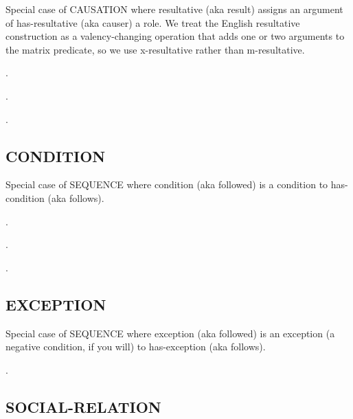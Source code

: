 \documentclass[a4paper]{article}
\newcommand{\fr}[1]{\textsf{#1}}
\newcommand{\rl}[1]{\textsf{#1}}
\begin{document}
Special case of \fr{CAUSATION} where \rl{resultative} (aka \rl{result}) assigns
an argument of \rl{has-resultative} (aka \rl{causer}) a role. We treat the
English resultative construction as a valency-changing operation that adds one
or two arguments to the matrix predicate, so we use \rl{x-resultative} rather
than \rl{m-resultative}.

\ex.

\ex.

\ex.


\subsection{\fr{CONDITION}}
\label{sec:CONDITION}

Special case of \fr{SEQUENCE} where \rl{condition} (aka \rl{followed}) is a
condition to \rl{has-condition} (aka \rl{follows}).

\ex.

\ex.

\ex.

\subsection{\fr{EXCEPTION}}
\label{sec:EXCEPTION}

Special case of \fr{SEQUENCE} where \rl{exception} (aka \rl{followed}) is an
exception (a negative condition, if you will) to \rl{has-exception} (aka \rl{follows}).

\ex.

\subsection{\fr{SOCIAL-RELATION}}
\label{sec:SOCIAL-RELATION}
\end{document}
